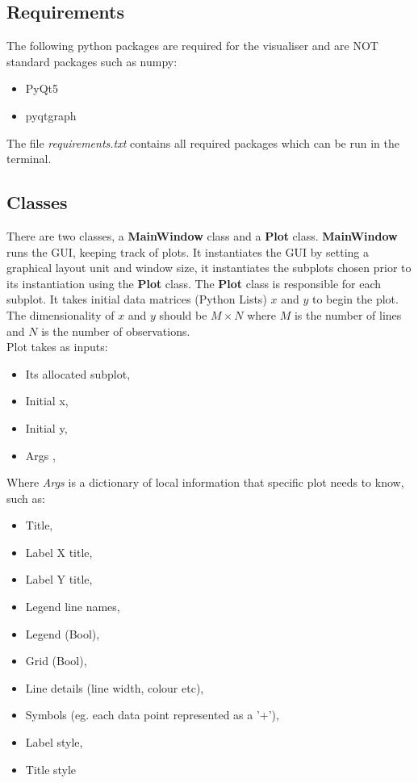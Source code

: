 \documentclass[12pt, a4paper]{article}
\begin{document}
\subsection{Requirements}
The following python packages are required for the visualiser and are NOT standard packages such as numpy:
\begin{itemize}
\item PyQt5
\item pyqtgraph
\end{itemize}
The file \textit{requirements.txt} contains all required packages which can be run in the terminal.
\subsection{Classes}
There are two classes, a \textbf{MainWindow} class and a \textbf{Plot} class. \textbf{MainWindow} runs the GUI, keeping track of plots. It instantiates the GUI by setting a graphical layout unit and window size, it instantiates the subplots chosen prior to its instantiation using the \textbf{Plot} class. The \textbf{Plot} class is responsible for each subplot. It takes initial data matrices (Python Lists) $x$ and $y$ to begin the plot. The dimensionality of $x$ and $y$ should be $M\times N$ where $M$ is the number of lines and $N$ is the number of observations. \\ 
Plot takes as inputs: 
\begin{itemize}
\item Its allocated subplot,
\item Initial x,
\item Initial y,
\item Args ,
\end{itemize}
Where \textit{Args} is a dictionary of local information that specific plot needs to know, such as:
\begin{itemize}
\item Title,
\item Label X title,
\item Label Y title,
\item Legend line names,
\item Legend (Bool),
\item Grid (Bool),
\item Line details (line width, colour etc),
\item Symbols (eg. each data point represented as a '+'),
\item Label style,
\item Title style
\end{itemize}
\end{document}
